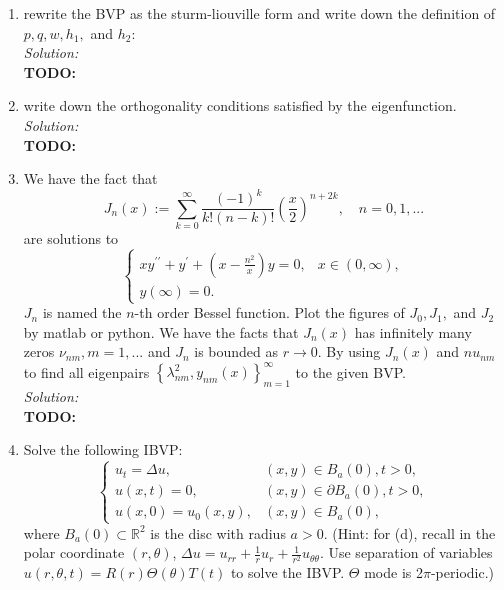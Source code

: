\documentclass[10pt]{amsart}
\theoremstyle{nonumberplain}
\begin{document}
\begin{enumerate}[label={\bf {\arabic*}:}]
\begin{enumerate}
\item rewrite the BVP as the sturm-liouville form and write down the definition of $p, q, w, h_1,$ and $h_2$: \\

\noindent
\textit{Solution:} \\
\textbf{TODO:} \\

\item write down the orthogonality conditions satisfied by the eigenfunction. \\

\noindent
\textit{Solution:} \\
\textbf{TODO:} \\

\item We have the fact that
$$
J_n(x) := \sum_{k = 0}^\infty\frac {(-1)^k}{k!(n - k)! } \left( \frac  x 2 \right)^{n + 2k}, \quad n = 0, 1, ...
$$
are solutions to 
$$
\begin{cases}
xy^{\prime\prime} + y^\prime + (x - \frac{n^2} x )y = 0, &x \in (0, \infty), \\
y(\infty) = 0.
\end{cases}
$$
$J_n$ is named the $n$-th order Bessel function.
Plot the figures of $J_0, J_1,$ and $J_2$ by matlab or python.
We have the facts that $J_n(x)$ has infinitely many zeros $\nu_{nm}, m = 1, ...$ and $J_n$ is bounded as $r \rightarrow 0$.
By using $J_n(x)$ and $nu_{nm}$ to find all eigenpairs $\left\{\lambda_{nm}^2, y_{nm}(x) \right\}_{m = 1}^\infty$ to the given BVP. \\

\noindent
\textit{Solution:} \\
\textbf{TODO:} \\

\item Solve the following IBVP:
$$
\begin{cases}
u_t = \Delta u, &(x, y) \in B_a(0), t> 0, \\
u(x, t) = 0, &(x, y) \in \partial B_a(0), t> 0, \\
u(x, 0) = u_0(x, y), &(x, y) \in B_a(0),
\end{cases}
$$
where $B_a(0) \subset \mathbb R^2$ is the disc with radius $a > 0$.
(Hint: for (d), recall in the polar coordinate $(r, \theta)$, $\Delta u = u_{rr} + \frac 1 r u_r + \frac 1 {r^2} u_{\theta\theta}$.
Use separation of variables $u(r, \theta, t) = R(r)\Theta(\theta)T(t)$ to solve the IBVP.
$\Theta$ mode is 2$\pi$-periodic.) \\


\end{enumerate}
\end{enumerate}
\end{document}
